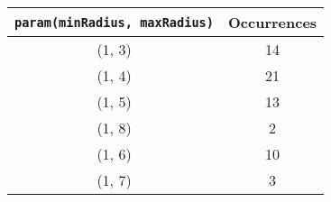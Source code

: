 \documentclass[letterpaper, 12pt]{article}
\begin{document}
\begin{longtable}{|c|c|}
\hline
\textbf{\texttt{param(minRadius, maxRadius)}} & \textbf{Occurrences} \\
\hline
(1, 3) & 14 \\
\hline
(1, 4) & 21 \\
\hline
(1, 5) & 13 \\
\hline
(1, 8) & 2 \\
\hline
(1, 6) & 10 \\
\hline
(1, 7) & 3 \\
\hline
\end{longtable}
\end{document}
